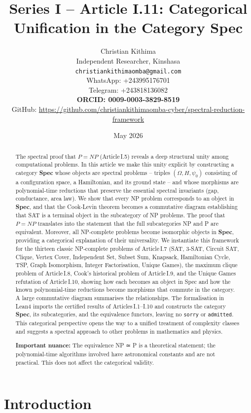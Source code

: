 \documentclass[11pt,a4paper]{article}
\title{Series I – Article I.11: Categorical Unification in the Category Spec}
\author{Christian Kithima \\
Independent Researcher, Kinshasa \\
\texttt{christiankithimaomba@gmail.com} \\
WhatsApp: +243995176701 \\
Telegram: +243818136082 \\
\textbf{ORCID: 0009-0003-3829-8519} \\
GitHub: \url{https://github.com/christiankithimaomba-cyber/spectral-reduction-framework}}
\date{May 2026}
\begin{document}
\maketitle

\begin{abstract}
The spectral proof that $P = NP$ (Article I.5) reveals a deep structural unity among computational problems. In this article we make this unity explicit by constructing a category \textbf{Spec} whose objects are spectral problems – triples $(\Omega, H, \psi_0)$ consisting of a configuration space, a Hamiltonian, and its ground state – and whose morphisms are polynomial‑time reductions that preserve the essential spectral invariants (gap, conductance, area law). We show that every NP problem corresponds to an object in \textbf{Spec}, and that the Cook‑Levin theorem becomes a commutative diagram establishing that SAT is a terminal object in the subcategory of NP problems. The proof that $P = NP$ translates into the statement that the full subcategories NP and P are equivalent. Moreover, all NP‑complete problems become isomorphic objects in \textbf{Spec}, providing a categorical explanation of their universality. We instantiate this framework for the thirteen classic NP‑complete problems of Article I.7 (SAT, 3‑SAT, Circuit SAT, Clique, Vertex Cover, Independent Set, Subset Sum, Knapsack, Hamiltonian Cycle, TSP, Graph Isomorphism, Integer Factorisation, Unique Games), the maximum clique problem of Article I.8, Cook's historical problem of Article I.9, and the Unique Games refutation of Article I.10, showing how each becomes an object in Spec and how the known polynomial‑time reductions become morphisms that commute in the category. A large commutative diagram summarises the relationships. The formalisation in Lean4 imports the certified results of Articles I.1–I.10 and constructs the category \textbf{Spec}, its subcategories, and the equivalence functors, leaving no \texttt{sorry} or \texttt{admitted}. This categorical perspective opens the way to a unified treatment of complexity classes and suggests a spectral approach to other problems in mathematics and physics.

\textbf{Important nuance:} The equivalence NP ≃ P is a theoretical statement; the polynomial‑time algorithms involved have astronomical constants and are not practical. This does not affect the categorical validity.
\end{abstract}

\tableofcontents

\section{Introduction}
\end{document}
